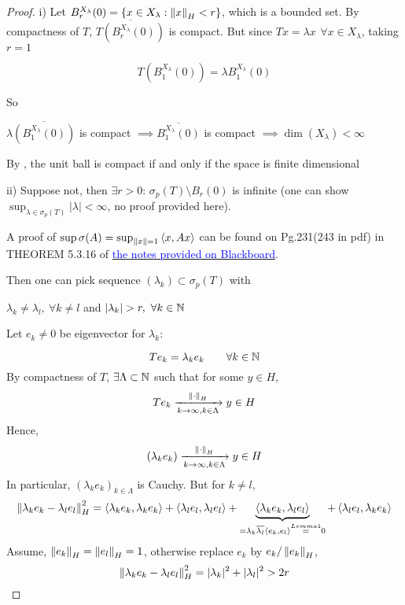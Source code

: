 \documentclass{article}
\begin{document}
\begin{proof}
		i) Let $B_r^{X_\lambda}(0)=\{x\in X_\lambda:\left\|{x}\right\|_H<r\}$, which is a bounded set. By compactness of $T$, $\overline{T(B_r^{X_\lambda}(0))}$ is compact. 
  But since $Tx=\lambda x\, \ \forall x\in X_\lambda$, taking $r=1$
  
  $$T(B_1^{X_\lambda}(0))=\lambda B_1^{X_\lambda}(0)$$
  
  So
  \begin{center}
        $\lambda\overline{(B_1^{X_\lambda}(0))}$ is compact $\implies \overline{B_1^{X_\lambda}(0)}$ is compact $\implies \dim(X_\lambda)<\infty$
  \end{center}
\begin{unexaminable}
    By , the unit ball is compact if and only if the space is finite dimensional
\end{unexaminable}
ii) Suppose not, then $\exists r>0$: $\sigma_p(T)\setminus B_r(0)$ is infinite (one can show $\sup_{\lambda\in\sigma_p(T)}|\lambda|<\infty$, no proof provided here).  
\begin{unexaminable}
    A proof of $\sup \sigma(A)=\sup_{\left\|{x}\right\|=1}\left<{x},{Ax}\right>$ can be found on Pg.231(243 in pdf) in THEOREM 5.3.16 of \href{https://people.math.ethz.ch/~salamon/PREPRINTS/funcana-ams.pdf}{\textcolor{blue}{the notes provided on Blackboard}}.
\end{unexaminable}

Then one can pick sequence $(\lambda_k)\subset\sigma_p(T)$ with 
\begin{center}
$\lambda_k\neq\lambda_l, \ \forall k\neq l$ and $|\lambda_k|>r, \ \forall k \in \natu$    
\end{center}

Let $e_k\neq0$ be eigenvector for $\lambda_k$: 

$$Te_k=\lambda_ke_k\qquad \forall k\in \mathbb{N}$$ 
By compactness of $T$, $\exists\Lambda\subset\mathbb{N}$ such that for some $y\in H$, $$Te_k\xrightarrow[k\to\infty,k\in\Lambda]{\left\|{\cdot}\right\|_H}y\in H$$
		Hence,
		$$(\lambda_ke_k)\xrightarrow[k\to\infty,k\in\Lambda]{\left\|{\cdot}\right\|_H}y\in H$$
		In particular, $(\lambda_ke_k)_{k\in\Lambda}$ is Cauchy. But for $k\neq l$,
		$$\left\|{\lambda_ke_k-\lambda_le_l}\right\|^2_H=
                \left<{\lambda_ke_k},{\lambda_ke_k}\right>
			+\left<{\lambda_le_l},{\lambda_le_l}\right>
			+\underbrace{\left<{\lambda_ke_k},{\lambda_le_l}\right>}_{=\lambda_k\overline{\lambda_l}\left<{e_k},{e_l}\right>\stackrel{Lemma1}{=}0}
			+\left<{\lambda_le_l},{\lambda_ke_k}\right>
		$$
		Assume, $\left\|{e_k}\right\|_H=\left\|{e_l}\right\|_H=1$, otherwise replace $e_k$ by $e_k/\left\|{e_k}\right\|_H$,
		$$
			\left\|{\lambda_ke_k-\lambda_le_l}\right\|^2_H=|\lambda_k|^2+|\lambda_l|^2>2r
		$$
\end{proof}  
\end{document}
